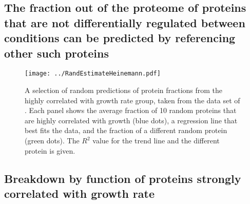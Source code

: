 \documentclass{article}
\begin{document}
\subsection{The fraction out of the proteome of proteins that are not differentially regulated between conditions can be predicted by referencing other such proteins}

\begin{figure}[H]
\begin{center}
\texttt{[image: ../RandEstimateHeinemann.pdf]}
\caption{\label{fig:randpred}
  A selection of random predictions of protein fractions from the highly correlated with growth rate group, taken from the data set of \cite{Schmidt2015}.
  Each panel shows the average fraction of 10 random proteins that are highly correlated with growth (blue dots), a regression line that best fits the data, and the fraction of a different random protein (green dots).
  The $R^2$ value for the trend line and the different protein is given.
%
}
\end{center}
\end{figure}

\subsection{Breakdown by function of proteins strongly correlated with growth rate}

\begin{table}[H]
\centering
{}
\caption{\label{tab:corrbreakdownh}
Breakdown by function of strongly positively correlated with growth rate proteins in the data set from \cite{Schmidt2015}%
}
\end{table}

\begin{table}[H]
\centering
{}
\caption{\label{tab:corrbreakdownv}
Breakdown by function of strongly positively correlated with growth rate proteins in the data set from \cite{Peebo_2015}%
}
\end{table}
\end{document}
